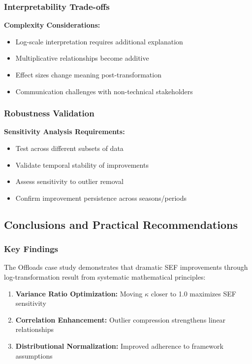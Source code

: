 \subsubsection{Interpretability Trade-offs}

\textbf{Complexity Considerations:}
\begin{itemize}
    \item Log-scale interpretation requires additional explanation
    \item Multiplicative relationships become additive
    \item Effect sizes change meaning post-transformation
    \item Communication challenges with non-technical stakeholders
\end{itemize}

\subsubsection{Robustness Validation}

\textbf{Sensitivity Analysis Requirements:}
\begin{itemize}
    \item Test across different subsets of data
    \item Validate temporal stability of improvements
    \item Assess sensitivity to outlier removal
    \item Confirm improvement persistence across seasons/periods
\end{itemize}

\subsection{Conclusions and Practical Recommendations}

\subsubsection{Key Findings}

The Offloads case study demonstrates that dramatic SEF improvements through log-transformation result from systematic mathematical principles:

\begin{enumerate}
    \item \textbf{Variance Ratio Optimization:} Moving $\kappa$ closer to 1.0 maximizes SEF sensitivity
    \item \textbf{Correlation Enhancement:} Outlier compression strengthens linear relationships
    \item \textbf{Distributional Normalization:} Improved adherence to framework assumptions
\end{enumerate}

